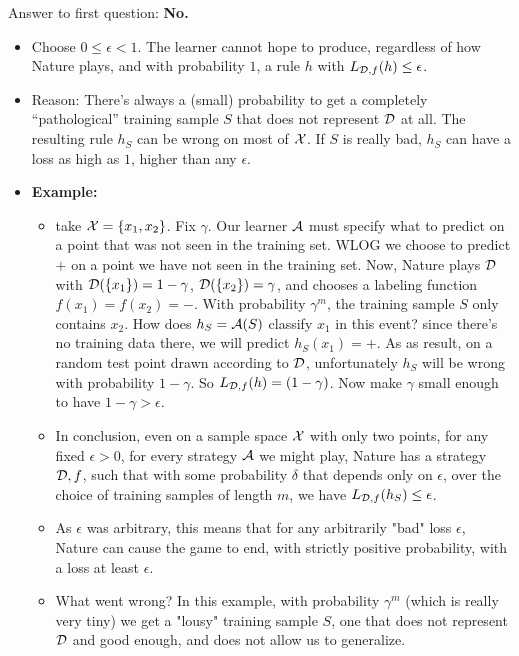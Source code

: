 {Answer to first question: {\bf No.}
\begin{itemize}
  \item Choose $0\leq \epsilon <1 $. The learner cannot hope to produce,
    regardless of how Nature plays, and with probability $1$, a
     rule $h$ with $L_{\mathcal{D},f}(h) \leq \epsilon$.
   \item Reason: There's always a (small) probability to get a completely ``pathological'' training
     sample $S$ that does not represent $\mathcal{D}$ at all. The resulting rule $h_S$ can
     be wrong on most of $\mathcal{X}$. If $S$ is really bad, $h_S$ can have a loss as
     high as $1$, higher than any $\epsilon$.
   \item {\bf Example: }
   \begin{itemize}
       \item 
   take $\mathcal{X}=\left\{ x_1,x_2 \right\}$.  Fix $\gamma$. Our learner $\mathcal{A}$ must specify what to predict on a point that was not seen in the training set. WLOG we choose to predict $+$ on a point we have not seen in the training set. Now, Nature plays $\mathcal{D}$ with
     $\mathcal{D}(\{x_1\}) = 1-\gamma$, $\mathcal{D}(\{x_2\}) = \gamma$, and chooses a labeling function $f(x_1)=f(x_2)=-$. 
     With probability
     $\gamma^m$, the training sample $S$ only contains $x_2$. How does $h_S=\mathcal{A}(S)$
     classify $x_1$ in this event? since there's no training data there, we will predict $h_S(x_1)=+$.
     As as result, on a random test point drawn according to $\mathcal{D}$, unfortunately $h_S$ will be wrong with probability $1-\gamma$. So
     $L_{\mathcal{D},f}(h)=(1-\gamma)$. Now make $\gamma$ small enough to have $1-\gamma
     > \epsilon$. 
     \item In conclusion, even on a sample space $\mathcal{X}$ with only two points, for any fixed $\epsilon>0$, 
     for every strategy $\mathcal{A}$ we might play, Nature has a strategy $\mathcal{D},f$, such that 
     with some probability $\delta$ that depends only on $\epsilon$, over the choice of training samples of length $m$, we have  
     $L_{\mathcal{D},f}(h_S) \leq \epsilon$.
     \item As $\epsilon$ was arbitrary, this means that for any arbitrarily "bad" loss $\epsilon$, Nature can cause the game to end, with strictly positive probability, with a loss at least $\epsilon$.
     \item What went wrong? In this example, with probability $\gamma^m$ (which is really very tiny) we get a "lousy" training sample $S$, one that does not represent $\mathcal{D}$ and good enough, and does not allow us to generalize. 
     \end{itemize}

\end{itemize}}

